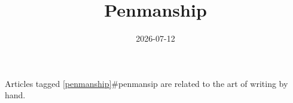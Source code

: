 \documentclass{note}
\title{Penmanship}
\date{2026-07-12}
\begin{document}
Articles tagged \ref{penmanship}{#penmansip} are related to the art of writing by hand.
\end{document}
